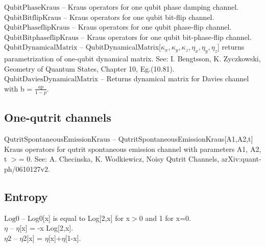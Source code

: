 \noindent\textbf{$ \text{QubitPhaseKraus} $ }-- Kraus operators for one qubit phase damping channel.$  $\\[6pt]

\noindent\textbf{$ \text{QubitBitflipKraus} $ }-- Kraus operators for one qubit bit-flip channel.$  $\\[6pt]

\noindent\textbf{$ \text{QubitPhaseflipKraus} $ }-- Kraus operators for one qubit phase-flip channel.$  $\\[6pt]

\noindent\textbf{$ \text{QubitBitphaseflipKraus} $ }-- Kraus operators for one qubit bit-phase-flip channel.$  $\\[6pt]

\noindent\textbf{$ \text{QubitDynamicalMatrix} $ }-- QubitDynamicalMatrix[$ \kappa _x,\kappa _y,\kappa _z,\eta _x,\eta _y,\eta _z $] returns parametrization of one-qubit dynamical matrix. See: I. Bengtsson, K. Zyczkowski, Geometry of Quantum States, Chapter 10, Eg.(10.81).$  $\\[6pt]

\noindent\textbf{$ \text{QubitDaviesDynamicalMatrix} $ }-- Returns dynamical matrix for Davies channel with b = $ \frac{a p}{1-p}. $\\[6pt]

\subsection{One-qutrit channels}

\noindent\textbf{$ \text{QutritSpontaneousEmissionKraus} $ }-- QutritSpontaneousEmissionKraus[A1,A2,t] Kraus operators for qutrit spontaneous emission channel with parameters A1, A2, t $>$= 0. See: A. Checinska, K. Wodkiewicz, Noisy Qutrit Channels, arXiv:quant-ph/0610127v2.$  $\\[6pt]

\subsection{Entropy}

\noindent\textbf{$ \text{Log0} $ }-- Log0[x] is equal to Log[2,x] for x$>$0 and 1 for x=0.$  $\\[6pt]

\noindent\textbf{$ \eta  $ }-- $\eta $[x] = -x Log[2,x].$  $\\[6pt]

\noindent\textbf{$ \text{$\eta $2} $ }-- $\eta $2[x] = $\eta $[x]+$\eta $[1-x].$  $\\[6pt]

